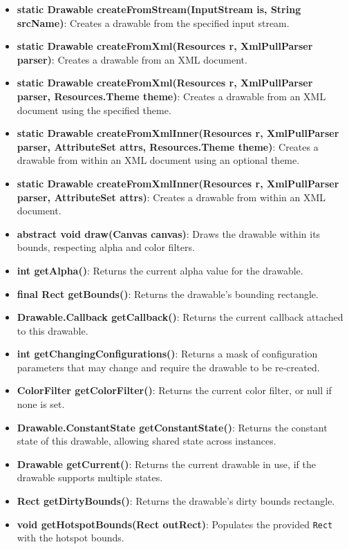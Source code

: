 \documentclass{report}
\begin{document}
\begin{itemize}
\begin{itemize}
                \item \textbf{static Drawable createFromStream(InputStream is, String srcName)}: Creates a drawable from the specified input stream.
                \item \textbf{static Drawable createFromXml(Resources r, XmlPullParser parser)}: Creates a drawable from an XML document.
                \item \textbf{static Drawable createFromXml(Resources r, XmlPullParser parser, Resources.Theme theme)}: Creates a drawable from an XML document using the specified theme.
                \item \textbf{static Drawable createFromXmlInner(Resources r, XmlPullParser parser, AttributeSet attrs, Resources.Theme theme)}: Creates a drawable from within an XML document using an optional theme.
                \item \textbf{static Drawable createFromXmlInner(Resources r, XmlPullParser parser, AttributeSet attrs)}: Creates a drawable from within an XML document.
                \item \textbf{abstract void draw(Canvas canvas)}: Draws the drawable within its bounds, respecting alpha and color filters.
                \item \textbf{int getAlpha()}: Returns the current alpha value for the drawable.
                \item \textbf{final Rect getBounds()}: Returns the drawable’s bounding rectangle.
                \item \textbf{Drawable.Callback getCallback()}: Returns the current callback attached to this drawable.
                \item \textbf{int getChangingConfigurations()}: Returns a mask of configuration parameters that may change and require the drawable to be re-created.
                \item \textbf{ColorFilter getColorFilter()}: Returns the current color filter, or null if none is set.
                \item \textbf{Drawable.ConstantState getConstantState()}: Returns the constant state of this drawable, allowing shared state across instances.
                \item \textbf{Drawable getCurrent()}: Returns the current drawable in use, if the drawable supports multiple states.
                \item \textbf{Rect getDirtyBounds()}: Returns the drawable’s dirty bounds rectangle.
                \item \textbf{void getHotspotBounds(Rect outRect)}: Populates the provided \texttt{Rect} with the hotspot bounds.

\end{itemize}
\end{itemize}
\end{document}

